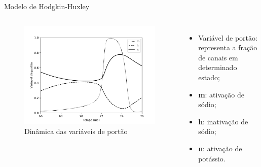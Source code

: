 \begin{frame}{Modelo de Hodgkin-Huxley}
	\begin{columns}[t]
		\column{5cm}
			\begin{figure}[tb]
				\centering
				\caption{Dinâmica das variáveis de portão}
				\label{fig:portoes}
				\includegraphics[width=0.9\linewidth]{figs/portoes}
			\end{figure}
		\column{5cm}
		\begin{itemize}
			\item Variável de portão: representa a fração de canais em determinado estado;
			\item \textbf{m}: ativação de sódio;
			\item \textbf{h}: inativação de sódio;
			\item \textbf{n}: ativação de potássio.
		\end{itemize}
	\end{columns}
\end{frame}

